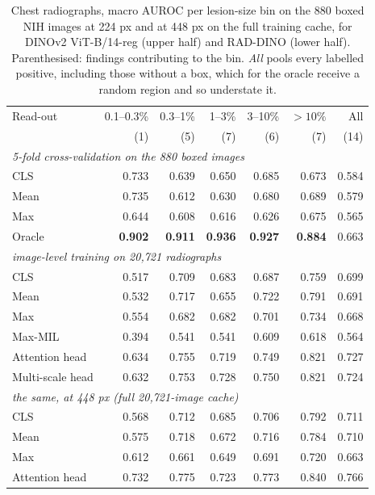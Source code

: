 \documentclass[10pt,letterpaper,twocolumn]{article}
\begin{document}
\begin{table}[t]
\centering\footnotesize\setlength{\tabcolsep}{3.5pt}
\caption{Chest radiographs, macro AUROC per lesion-size bin on the 880 boxed NIH images at
224 px and at 448 px on the full training cache, for DINOv2 ViT-B/14-reg (upper half) and RAD-DINO (lower half). Parenthesised:
findings contributing to the bin. \emph{All} pools every labelled positive, including those
without a box, which for the oracle receive a random region and so understate it.}
\label{tab:cxr}
\begin{tabular}{lrrrrrr}
\toprule
Read-out & 0.1--0.3\% & 0.3--1\% & 1--3\% & 3--10\% & $>10\%$ & All \\
 & (1) & (5) & (7) & (6) & (7) & (14) \\
\midrule
\multicolumn{7}{l}{\emph{5-fold cross-validation on the 880 boxed images}} \\
CLS    & 0.733 & 0.639 & 0.650 & 0.685 & 0.673 & 0.584 \\
Mean   & 0.735 & 0.612 & 0.630 & 0.680 & 0.689 & 0.579 \\
Max    & 0.644 & 0.608 & 0.616 & 0.626 & 0.675 & 0.565 \\
Oracle & \textbf{0.902} & \textbf{0.911} & \textbf{0.936} & \textbf{0.927} & \textbf{0.884} & 0.663 \\
\midrule
\multicolumn{7}{l}{\emph{image-level training on 20,721 radiographs}} \\
CLS    & 0.517 & 0.709 & 0.683 & 0.687 & 0.759 & 0.699 \\
Mean   & 0.532 & 0.717 & 0.655 & 0.722 & 0.791 & 0.691 \\
Max    & 0.554 & 0.682 & 0.682 & 0.701 & 0.734 & 0.668 \\
Max-MIL          & 0.394 & 0.541 & 0.541 & 0.609 & 0.618 & 0.564 \\
Attention head   & 0.634 & 0.755 & 0.719 & 0.749 & 0.821 & 0.727 \\
Multi-scale head & 0.632 & 0.753 & 0.728 & 0.750 & 0.821 & 0.724 \\
\multicolumn{7}{l}{\emph{the same, at 448 px (full 20,721-image cache)}} \\
CLS            & 0.568 & 0.712 & 0.685 & 0.706 & 0.792 & 0.711 \\
Mean           & 0.575 & 0.718 & 0.672 & 0.716 & 0.784 & 0.710 \\
Max            & 0.612 & 0.661 & 0.649 & 0.691 & 0.720 & 0.663 \\
Attention head & 0.732 & 0.775 & 0.723 & 0.773 & 0.840 & 0.766 \\

\end{tabular}
\end{table}
\end{document}
